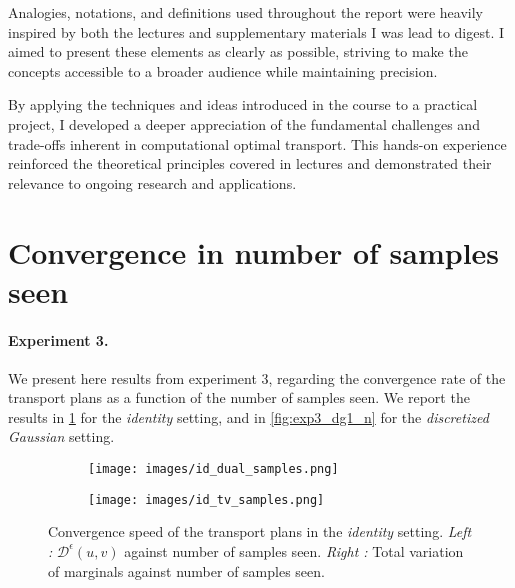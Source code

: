 \documentclass[a4paper,11pt]{article}
\newcommand{\1}{\mathbbm{1}}
\begin{document}
Analogies, notations, and definitions used throughout the report were heavily inspired by both the lectures and supplementary materials I was lead to digest. I aimed to present these elements as clearly as possible, striving to make the concepts accessible to a broader audience while maintaining precision.

By applying the techniques and ideas introduced in the course to a practical project, I developed a deeper appreciation of the fundamental challenges and trade-offs inherent in computational optimal transport. This hands-on experience reinforced the theoretical principles covered in lectures and demonstrated their relevance to ongoing research and applications.

\clearpage




\newpage
\appendix

\section{Convergence in number of samples seen}
\label{app:conv_sample}

\paragraph{Experiment 3.}We present here results from experiment 3, regarding the convergence rate of the transport plans as a function of the number of samples seen. We report the results in \cref{fig:exp3_id_n} for the \emph{identity} setting, and in \cref{fig:exp3_dg1_n} for the \emph{discretized Gaussian} setting.

\begin{figure}[H]
    \centering
    \begin{subfigure}{0.48\linewidth}
        \centering
        \texttt{[image: images/id\_dual\_samples.png]}
    \end{subfigure}%
    \hfill
    \begin{subfigure}{0.48\linewidth}
        \centering
        \texttt{[image: images/id\_tv\_samples.png]}
    \end{subfigure}
    \caption{Convergence speed of the transport plans in the \emph{identity} setting. \emph{Left :} $\mathcal{D}^{\epsilon}(u, v)$ against number of samples seen. \emph{Right :} Total variation of marginals against number of samples seen.}
    \label{fig:exp3_id_n}
\end{figure}
\end{document}
